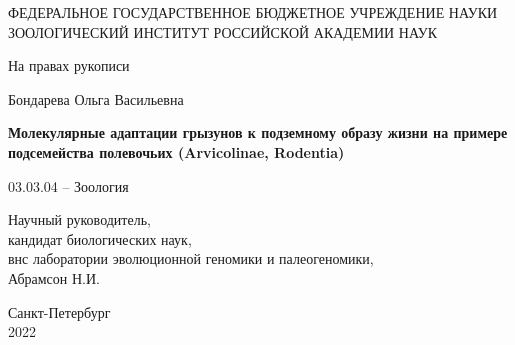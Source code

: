 \thispagestyle{empty}%
\begin{center}%
\MakeUppercase{Федеральное государственное бюджетное учреждение науки Зоологический институт Российской академии наук}
\end{center}%

\vspace{05mm}

\begin{flushright}%
	На правах рукописи
\end{flushright}%
%
\vspace{0pt plus6fill} %
\begin{center}%
{\large Бондарева Ольга Васильевна}
\end{center}%

%
\vspace{0pt plus1fill} %

\begin{center}%
\textbf{\large Молекулярные адаптации грызунов к подземному образу жизни на примере подсемейства полевочьих (Arvicolinae, Rodentia)}

\vspace{0pt plus1fill}

03.03.04 -- Зоология

\end{center}%
%
\vspace{0pt plus4fill} %

\begin{flushright}%
	
Научный руководитель,\\
кандидат биологических наук,\\
внс лаборатории эволюционной геномики и палеогеномики, \\
Абрамсон Н.И.


\end{flushright}%
%
\vspace{0pt plus4fill} %
\begin{center}%
{Санкт-Петербург\\ 2022}
\end{center}%
\newpage
